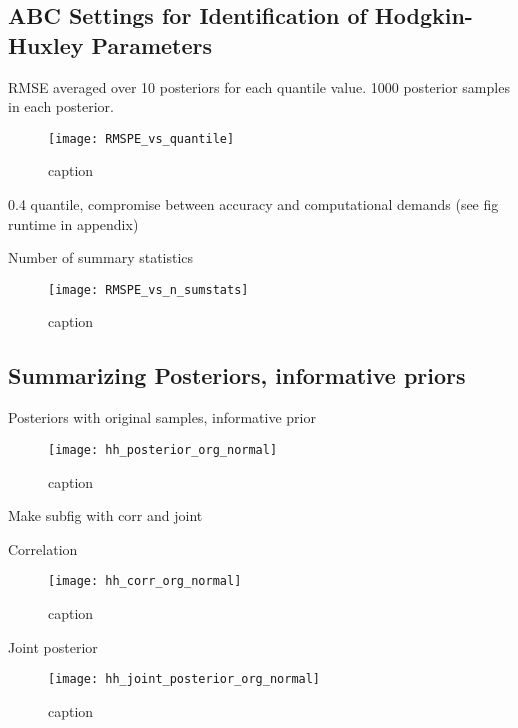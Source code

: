 \subsection{ABC Settings for Identification of Hodgkin-Huxley Parameters}

RMSE averaged over 10 posteriors for each quantile value. 1000 posterior samples in each posterior. 

\begin{figure}[H]
    \centering
    \texttt{[image: RMSPE\_vs\_quantile]}
    \caption{caption}
    \label{fig:fig1}
\end{figure} 

0.4 quantile, compromise between accuracy and computational demands (see fig runtime in appendix)

Number of summary statistics

\begin{figure}[H]
    \centering
    \texttt{[image: RMSPE\_vs\_n\_sumstats]}
    \caption{caption}
    \label{fig:fig1}
\end{figure} 


\subsection{Summarizing Posteriors, informative priors}

Posteriors with original samples, informative prior

\begin{figure}[H]
    \centering
    \texttt{[image: hh\_posterior\_org\_normal]}
    \caption{caption}
    \label{fig:fig1}
\end{figure}

Make subfig with corr and joint

Correlation 

\begin{figure}[H]
    \centering
    \texttt{[image: hh\_corr\_org\_normal]}
    \caption{caption}
    \label{fig:fig1}
\end{figure}

Joint posterior 

\begin{figure}[H]
    \centering
    \texttt{[image: hh\_joint\_posterior\_org\_normal]}
    \caption{caption}
    \label{fig:fig1}
\end{figure}

